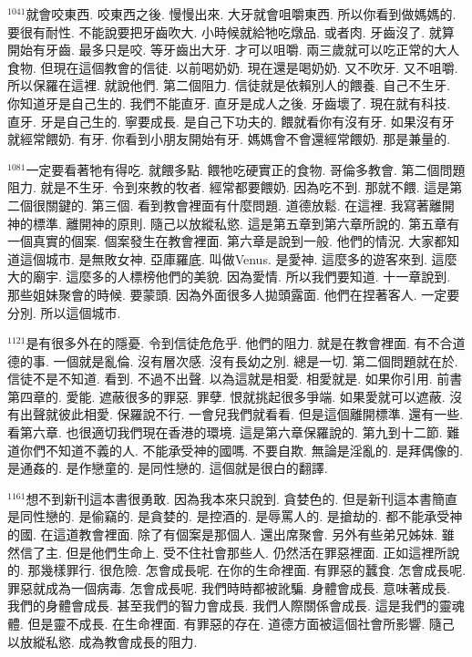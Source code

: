 \documentclass{book}
\begin{document}
$^{1041}$就會咬東西.
咬東西之後.
慢慢出來.
大牙就會咀嚼東西.
所以你看到做媽媽的.
要很有耐性.
不能說要把牙齒吹大.
小時候就給牠吃燉品.
或者肉.
牙齒沒了.
就算開始有牙齒.
最多只是咬.
等牙齒出大牙.
才可以咀嚼.
兩三歲就可以吃正常的大人食物.
但現在這個教會的信徒.
以前喝奶奶.
現在還是喝奶奶.
又不吹牙.
又不咀嚼.
所以保羅在這裡.
就說他們.
第二個阻力.
信徒就是依賴別人的餵養.
自己不生牙.
你知道牙是自己生的.
我們不能直牙.
直牙是成人之後.
牙齒壞了.
現在就有科技.
直牙.
牙是自己生的.
寧要成長.
是自己下功夫的.
餵就看你有沒有牙.
如果沒有牙就經常餵奶.
有牙.
你看到小朋友開始有牙.
媽媽會不會還經常餵奶.
那是兼量的.

$^{1081}$一定要看著牠有得吃.
就餵多點.
餵牠吃硬實正的食物.
哥倫多教會.
第二個問題阻力.
就是不生牙.
令到來教的牧者.
經常都要餵奶.
因為吃不到.
那就不餵.
這是第二個很關鍵的.
第三個.
看到教會裡面有什麼問題.
道德放鬆.
在這裡.
我寫著離開神的標準.
離開神的原則.
隨己以放縱私慾.
這是第五章到第六章所說的.
第五章有一個真實的個案.
個案發生在教會裡面.
第六章是說到一般.
他們的情況.
大家都知道這個城市.
是無敗女神.
亞庫羅底.
叫做Venus.
是愛神.
這麼多的遊客來到.
這麼大的廟宇.
這麼多的人標榜他們的美貌.
因為愛情.
所以我們要知道.
十一章說到.
那些姐妹聚會的時候.
要蒙頭.
因為外面很多人拋頭露面.
他們在捏著客人.
一定要分別.
所以這個城市.

$^{1121}$是有很多外在的隱憂.
令到信徒危危乎.
他們的阻力.
就是在教會裡面.
有不合道德的事.
一個就是亂倫.
沒有層次感.
沒有長幼之別.
總是一切.
第二個問題就在於.
信徒不是不知道.
看到.
不過不出聲.
以為這就是相愛.
相愛就是.
如果你引用.
前書第四章的.
愛能.
遮蔽很多的罪惡.
罪孽.
恨就挑起很多爭端.
如果愛就可以遮蔽.
沒有出聲就彼此相愛.
保羅說不行.
一會兒我們就看看.
但是這個離開標準.
還有一些.
看第六章.
也很適切我們現在香港的環境.
這是第六章保羅說的.
第九到十二節.
難道你們不知道不義的人.
不能承受神的國嗎.
不要自欺.
無論是淫亂的.
是拜偶像的.
是通姦的.
是作戀童的.
是同性戀的.
這個就是很白的翻譯.

$^{1161}$想不到新刊這本書很勇敢.
因為我本來只說到.
貪婪色的.
但是新刊這本書簡直是同性戀的.
是偷竊的.
是貪婪的.
是控酒的.
是辱罵人的.
是搶劫的.
都不能承受神的國.
在這道教會裡面.
除了有個案是那個人.
還出席聚會.
另外有些弟兄姊妹.
雖然信了主.
但是他們生命上.
受不住社會那些人.
仍然活在罪惡裡面.
正如這裡所說的.
那幾樣罪行.
很危險.
怎會成長呢.
在你的生命裡面.
有罪惡的蠶食.
怎會成長呢.
罪惡就成為一個病毒.
怎會成長呢.
我們時時都被訛騙.
身體會成長.
意味著成長.
我們的身體會成長.
甚至我們的智力會成長.
我們人際關係會成長.
這是我們的靈魂體.
但是靈不成長.
在生命裡面.
有罪惡的存在.
道德方面被這個社會所影響.
隨己以放縱私慾.
成為教會成長的阻力.
\end{document}
